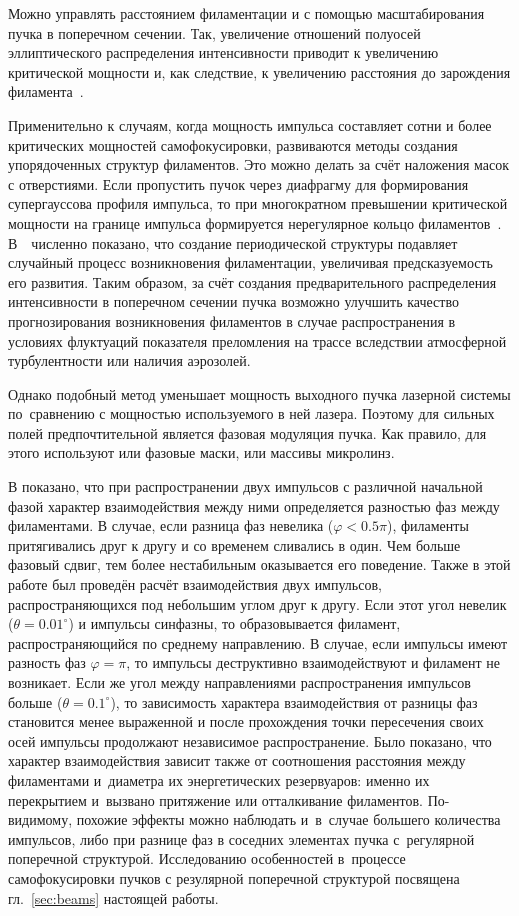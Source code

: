 Можно управлять расстоянием филаментации и с помощью масштабирования пучка в поперечном сечении.
Так, увеличение отношений полуосей эллиптического распределения интенсивности приводит
к увеличению критической мощности и, как следствие, к увеличению
расстояния до зарождения филамента~\cite{KandidovFedorov2004}.


Применительно к случаям, когда мощность импульса составляет сотни и более критических
мощностей самофокусировки, развиваются методы создания упорядоченных структур филаментов.
Это можно делать за счёт наложения масок с отверстиями. Если пропустить пучок через
диафрагму для формирования супергауссова профиля импульса, то при многократном превышении критической
мощности на границе импульса формируется нерегулярное кольцо филаментов~\cite{GrowIshaayaVuong2006}.
В~\cite{PanovKosarevaKandidov2006}~численно показано, что создание периодической структуры
подавляет случайный процесс возникновения филаментации, увеличивая предсказуемость его развития.
Таким образом, за счёт создания предварительного распределения интенсивности в поперечном
сечении пучка возможно улучшить качество прогнозирования возникновения филаментов в случае распространения
в условиях флуктуаций показателя преломления на трассе вследствии атмосферной турбулентности или наличия аэрозолей.


Однако подобный метод уменьшает мощность выходного пучка лазерной системы по~сравнению
с мощностью используемого в ней лазера. Поэтому для сильных полей предпочтительной
является фазовая модуляция пучка. Как правило, для этого используют или фазовые маски, или
массивы микролинз.


В \cite{TingTing2006} показано, что при распространении двух импульсов с различной начальной фазой
характер взаимодействия между ними определяется разностью фаз между филаментами.
В случае, если разница фаз невелика ($\varphi < 0.5\pi$), филаменты притягивались друг к другу
и со временем сливались в один. Чем больше фазовый сдвиг, тем более нестабильным оказывается его поведение.
Также в этой работе был проведён расчёт взаимодействия двух импульсов, распространяющихся под небольшим углом друг к другу.
Если этот угол невелик ($\theta = 0.01^{\circ}$) и импульсы синфазны, то образовывается филамент, распространяющийся по среднему направлению.
В случае, если импульсы имеют разность фаз $\varphi = \pi$, то импульсы деструктивно взаимодействуют и филамент не возникает.
Если же угол между направлениями распространения импульсов больше ($\theta = 0.1^{\circ}$),
то зависимость характера взаимодействия от разницы фаз становится менее выраженной
и после прохождения точки пересечения своих осей импульсы продолжают независимое распространение.
Было показано, что характер взаимодействия зависит также от соотношения расстояния между филаментами и~диаметра их энергетических резервуаров:
именно их перекрытием и~вызвано притяжение или отталкивание филаментов.
По-видимому, похожие эффекты можно наблюдать и~в~случае большего количества импульсов,
либо при разнице фаз в соседних элементах пучка с~регулярной поперечной структурой.
Исследованию особенностей в~процессе самофокусировки пучков с резулярной поперечной структурой
посвящена гл.~\ref{sec:beams} настоящей работы.


